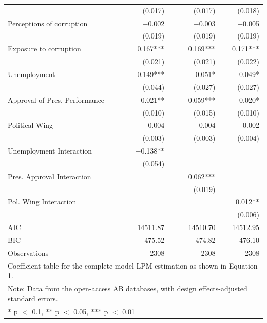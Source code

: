 \documentclass[floatsintext,man]{apa7}\usepackage[]{graphicx}\usepackage[]{color}
\begin{document}
\begin{longtable}[t]{lrrr}
 & (\num{0.017}) & (\num{0.017}) & (\num{0.018})\\
Perceptions of corruption & \num{-0.002} & \num{-0.003} & \num{-0.005}\\
 & (\num{0.019}) & (\num{0.019}) & (\num{0.019})\\
Exposure to corruption & \num{0.167}*** & \num{0.169}*** & \num{0.171}***\\
 & (\num{0.021}) & (\num{0.021}) & (\num{0.022})\\
Unemployment & \num{0.149}*** & \num{0.051}* & \num{0.049}*\\
 & (\num{0.044}) & (\num{0.027}) & (\num{0.027})\\
Approval of Pres. Performance & \num{-0.021}** & \num{-0.059}*** & \num{-0.020}*\\
 & (\num{0.010}) & (\num{0.015}) & (\num{0.010})\\
Political Wing & \num{0.004} & \num{0.004} & \num{-0.002}\\
 & (\num{0.003}) & (\num{0.003}) & (\num{0.004})\\
Unemployment Interaction & \num{-0.138}** &  & \\
 & (\num{0.054}) &  & \\
Pres. Approval Interaction &  & \num{0.062}*** & \\
 &  & (\num{0.019}) & \\
Pol. Wing Interaction &  &  & \num{0.012}**\\
 &  &  & (\num{0.006})\\
\midrule
AIC & \num{14511.87} & \num{14510.70} & \num{14512.95}\\
BIC & \num{475.52} & \num{474.82} & \num{476.10}\\
Observations & 2308 & 2308 & 2308\\
\bottomrule
\multicolumn{4}{l}{\rule{0pt}{1em}Coefficient table for the complete model LPM estimation as shown in Equation 1.}\\
\multicolumn{4}{l}{\rule{0pt}{1em}Note: Data from the open-access AB databases, with design effects-adjusted standard errors.}\\
\multicolumn{4}{l}{\rule{0pt}{1em}* p $<$ 0.1, ** p $<$ 0.05, *** p $<$ 0.01}\\
\end{longtable}


\clearpage

\end{document}
